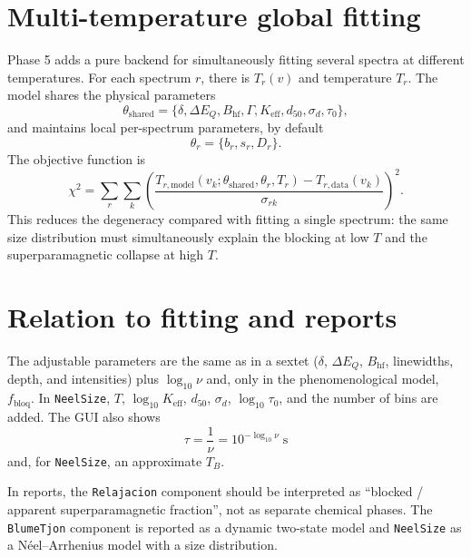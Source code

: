 \documentclass[11pt,a4paper]{article}
\newcommand{\BHF}{B_{\mathrm{hf}}}
\newcommand{\dEQ}{\Delta E_Q}
\newcommand{\code}[1]{\texttt{\small #1}}
\begin{document}
\section{Multi-temperature global fitting}

Phase 5 adds a pure backend for simultaneously fitting several spectra at
different temperatures. For each spectrum $r$, there is $T_r(v)$ and temperature
$T_r$. The model shares the physical parameters
\begin{equation}
  \theta_{\mathrm{shared}}=\{\delta,\dEQ,\BHF,\Gamma,K_{\mathrm{eff}},d_{50},
  \sigma_d,\tau_0\},
\end{equation}
and maintains local per-spectrum parameters, by default
\begin{equation}
  \theta_r=\{b_r,s_r,D_r\}.
\end{equation}
The objective function is
\begin{equation}
  \chi^2=\sum_r\sum_k
  \left(\frac{T_{r,\mathrm{model}}(v_k;\theta_{\mathrm{shared}},\theta_r,T_r)
  -T_{r,\mathrm{data}}(v_k)}{\sigma_{rk}}\right)^2.
\end{equation}
This reduces the degeneracy compared with fitting a single spectrum: the same
size distribution must simultaneously explain the blocking at low $T$ and the
superparamagnetic collapse at high $T$.

\section{Relation to fitting and reports}

The adjustable parameters are the same as in a sextet ($\delta$, $\dEQ$,
$\BHF$, linewidths, depth, and intensities) plus $\log_{10}\nu$ and, only in the
phenomenological model, $f_{\mathrm{bloq}}$. In \code{NeelSize}, $T$,
$\log_{10}K_{\mathrm{eff}}$, $d_{50}$, $\sigma_d$, $\log_{10}\tau_0$, and the
number of bins are added. The GUI also shows
\begin{equation}
  \tau=\frac{1}{\nu}=10^{-\log_{10}\nu}\;\mathrm{s}
\end{equation}
and, for \code{NeelSize}, an approximate $T_B$.

In reports, the \code{Relajacion} component should be interpreted as
``blocked / apparent superparamagnetic fraction'', not as separate chemical
phases. The \code{BlumeTjon} component is reported as a dynamic two-state model
and \code{NeelSize} as a N\'{e}el--Arrhenius model with a size distribution.
\end{document}
